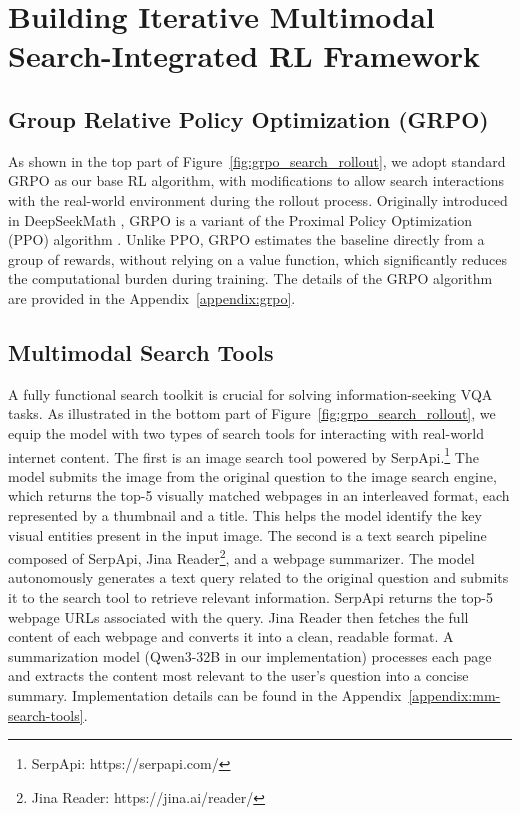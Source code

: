 \documentclass{article}
\begin{document}
\section{Building Iterative Multimodal Search-Integrated RL Framework}
\subsection{Group Relative Policy Optimization (GRPO)}
As shown in the top part of Figure~\ref{fig:grpo_search_rollout}, we adopt standard GRPO as our base RL algorithm, with modifications to allow search interactions with the real-world environment during the rollout process. Originally introduced in DeepSeekMath \cite{rl/deepseekmath}, GRPO is a variant of the Proximal Policy Optimization (PPO) algorithm \cite{rl/ppo}. Unlike PPO, GRPO estimates the baseline directly from a group of rewards, without relying on a value function, which significantly reduces the computational burden during training. The details of the GRPO algorithm are provided in the Appendix~\ref{appendix:grpo}.

\subsection{Multimodal Search Tools} 
A fully functional search toolkit is crucial for solving information-seeking VQA tasks. As illustrated in the bottom part of Figure~\ref{fig:grpo_search_rollout}, we equip the model with two types of search tools for interacting with real-world internet content. The first is an image search tool powered by SerpApi.\footnote{SerpApi: https://serpapi.com/} The model submits the image from the original question to the image search engine, which returns the top-5 visually matched webpages in an interleaved format, each represented by a thumbnail and a title. This helps the model identify the key visual entities present in the input image. The second is a text search pipeline composed of SerpApi, Jina Reader\footnote{Jina Reader: https://jina.ai/reader/}, and a webpage summarizer. The model autonomously generates a text query related to the original question and submits it to the search tool to retrieve relevant information. SerpApi returns the top-5 webpage URLs associated with the query. Jina Reader then fetches the full content of each webpage and converts it into a clean, readable format. A summarization model (Qwen3-32B \cite{qwen3-tech-report} in our implementation) processes each page and extracts the content most relevant to the user’s question into a concise summary. Implementation details can be found in the Appendix~\ref{appendix:mm-search-tools}.
\end{document}
